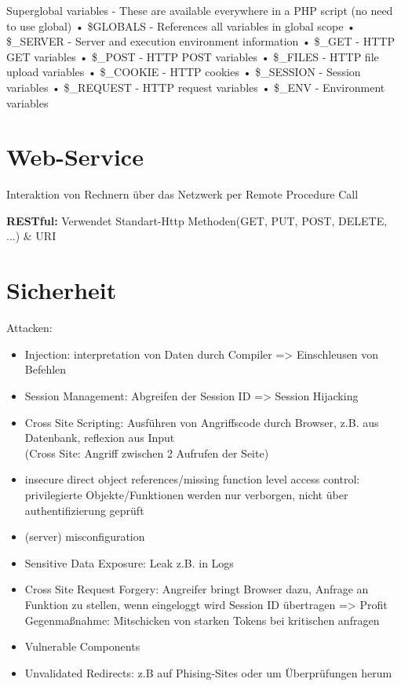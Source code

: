 Superglobal variables
- These are available everywhere in a PHP script (no need to use global)
• \$GLOBALS - References all variables in global scope
• \$\_SERVER - Server and execution environment information
• \$\_GET
- HTTP GET variables
• \$\_POST
- HTTP POST variables
• \$\_FILES
- HTTP file upload variables
• \$\_COOKIE - HTTP cookies
• \$\_SESSION - Session variables
• \$\_REQUEST - HTTP request variables
• \$\_ENV
- Environment variables

\section*{Web-Service}
Interaktion von Rechnern über das Netzwerk per Remote Procedure Call

\textbf{RESTful:} Verwendet Standart-Http Methoden(GET, PUT, POST, DELETE, ...) \& URI

\section*{Sicherheit}
Attacken:
\begin{itemize}
\item Injection: interpretation von Daten durch Compiler => Einschleusen von Befehlen
\item Session Management: Abgreifen der Session ID => Session Hijacking
\item Cross Site Scripting: Ausführen von Angriffscode durch Browser, z.B. aus Datenbank, reflexion aus Input\\
(Cross Site: Angriff zwischen 2 Aufrufen der Seite)
\item insecure direct object references/missing function level access control: privilegierte Objekte/Funktionen werden nur verborgen, nicht über authentifizierung geprüft
\item (server) misconfiguration 
\item Sensitive Data Exposure: Leak z.B. in Logs
\item Cross Site Request Forgery: Angreifer bringt Browser dazu, Anfrage an Funktion zu stellen, wenn eingeloggt wird Session ID übertragen => Profit\\
Gegenmaßnahme: Mitschicken von starken Tokens bei kritischen anfragen
\item Vulnerable Components 
\item Unvalidated Redirects: z.B auf Phising-Sites oder um Überprüfungen herum
\end{itemize}
